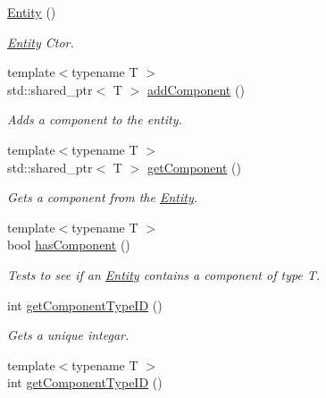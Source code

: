 \begin{DoxyCompactItemize}
\item 
\hyperlink{class_cookie_eng_1_1_e_c_s_1_1_entity_a8e57da947b47b9124ad26fabf7cbbb89}{Entity} ()
\begin{DoxyCompactList}\small\item\em \hyperlink{class_cookie_eng_1_1_e_c_s_1_1_entity}{Entity} Ctor. \end{DoxyCompactList}\item 
{\footnotesize template$<$typename T $>$ }\\std\+::shared\+\_\+ptr$<$ T $>$ \hyperlink{class_cookie_eng_1_1_e_c_s_1_1_entity_a7b24f6959d8f1686e02e8ae5ef61f08c}{add\+Component} ()
\begin{DoxyCompactList}\small\item\em Adds a component to the entity. \end{DoxyCompactList}\item 
{\footnotesize template$<$typename T $>$ }\\std\+::shared\+\_\+ptr$<$ T $>$ \hyperlink{class_cookie_eng_1_1_e_c_s_1_1_entity_a7e954d74445ccffe29412c885d97bf63}{get\+Component} ()
\begin{DoxyCompactList}\small\item\em Gets a component from the \hyperlink{class_cookie_eng_1_1_e_c_s_1_1_entity}{Entity}. \end{DoxyCompactList}\item 
{\footnotesize template$<$typename T $>$ }\\bool \hyperlink{class_cookie_eng_1_1_e_c_s_1_1_entity_a594daff6ddf321ac9c3a2fad3e50620e}{has\+Component} ()
\begin{DoxyCompactList}\small\item\em Tests to see if an \hyperlink{class_cookie_eng_1_1_e_c_s_1_1_entity}{Entity} contains a component of type T. \end{DoxyCompactList}\item 
int \hyperlink{class_cookie_eng_1_1_e_c_s_1_1_entity_a13d0c3e85c8cb4672371401726df4490}{get\+Component\+Type\+ID} ()
\begin{DoxyCompactList}\small\item\em Gets a unique integar. \end{DoxyCompactList}\item 
{\footnotesize template$<$typename T $>$ }\\int \hyperlink{class_cookie_eng_1_1_e_c_s_1_1_entity_a6fcce356d5a9a67a785c4e80c155306d}{get\+Component\+Type\+ID} ()

\end{DoxyCompactItemize}
